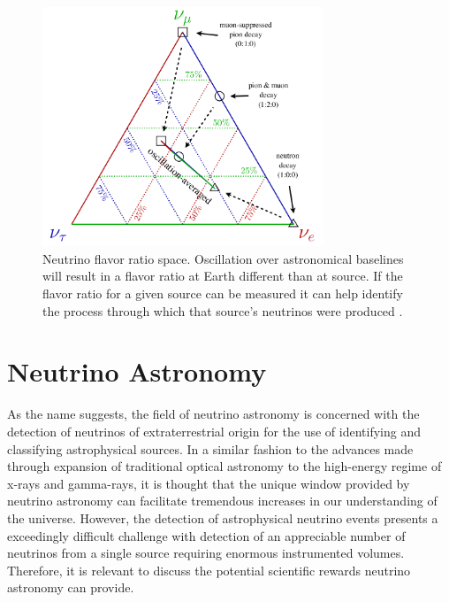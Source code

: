 \documentclass{gatech-thesis}
\begin{document}
\begin{figure}[ht]
  \begin{center}
    \includegraphics[width=0.75\textwidth,keepaspectratio]{AstroBaselineOsc.png}
  \end{center}
  \caption[Flavor Flux Evolution over Astronomical Baselines]{Neutrino flavor ratio space. Oscillation over astronomical baselines will result in a flavor ratio at Earth different than at source. If the flavor ratio for a given source can be measured it can help identify the process through which that source's neutrinos were produced \cite{2014arXiv1412.5106I}.}
  \label{fig:baseline_osc}
\end{figure}

\chapter{Neutrino Astronomy}
As the name suggests, the field of neutrino astronomy is concerned with the detection of neutrinos of extraterrestrial origin for the use of identifying and classifying astrophysical sources. In a similar fashion to the advances made through expansion of traditional optical astronomy to the high-energy regime of x-rays and gamma-rays, it is thought that the unique window provided by neutrino astronomy can facilitate tremendous increases in our understanding of the universe. However, the detection of astrophysical neutrino events presents a exceedingly difficult challenge with detection of an appreciable number of neutrinos from a single source requiring enormous instrumented volumes. Therefore, it is relevant to discuss the potential scientific rewards neutrino astronomy can provide.
\end{document}
